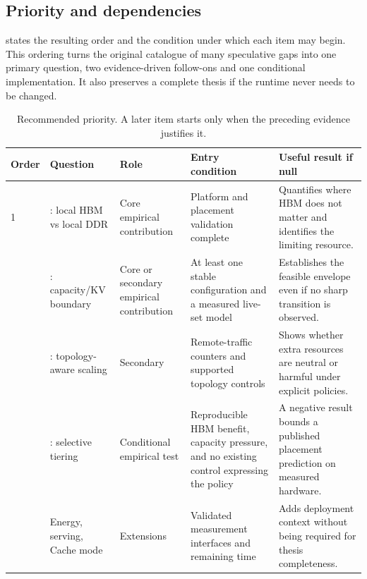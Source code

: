 \subsection{Priority and dependencies}

 states the resulting order and the condition
under which each item may begin.  This ordering turns the original
catalogue of many speculative gaps into one primary question, two
evidence-driven follow-ons and one conditional implementation.  It also preserves a complete thesis if
the runtime never needs to be changed.

\begin{table}[htbp]
\centering
\small
\tabsetup
\caption{Recommended priority.  A later item starts only when the
preceding evidence justifies it.}
\label{tab:gap-priority}
\begin{tabularx}{\textwidth}{@{}P{1.25cm}P{3.35cm}P{2.65cm}YY@{}}
\toprule
\headrow
\textbf{Order} & \textbf{Question} & \textbf{Role} &
\textbf{Entry condition} & \textbf{Useful result if null} \\
 & : local HBM vs local DDR & Core empirical contribution
& Platform and placement validation complete
& Quantifies where HBM does not matter and identifies the limiting
  resource. \\
 & : capacity/KV boundary & Core or secondary empirical contribution
& At least one stable configuration and a measured live-set model
& Establishes the feasible envelope even if no sharp transition is
  observed. \\
 & : topology-aware scaling & Secondary
& Remote-traffic counters and supported topology controls
& Shows whether extra resources are neutral or harmful under explicit
  policies. \\
 & : selective tiering & Conditional empirical test
& Reproducible HBM benefit, capacity pressure, and no existing control
  expressing the policy
& A negative result bounds a published placement prediction on measured
  hardware. \\
 & Energy, serving, Cache mode & Extensions
& Validated measurement interfaces and remaining time
& Adds deployment context without being required for thesis completeness. \\
\bottomrule
\end{tabularx}
\end{table}
